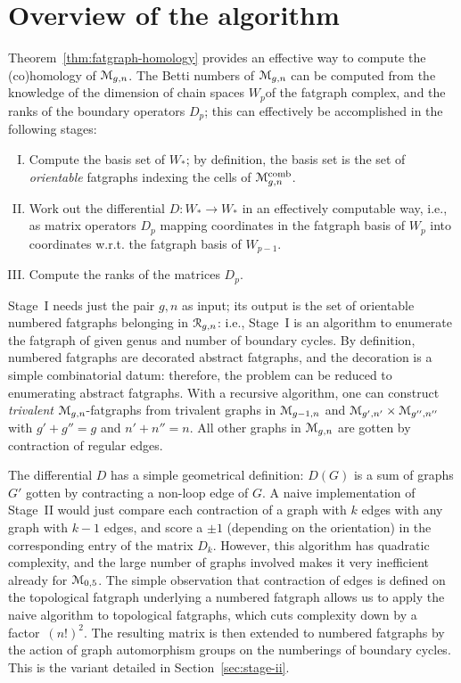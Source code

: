 \section[Overview]{Overview of the algorithm}
\label{sec:overview}

Theorem~\ref{thm:fatgraph-homology} provides an effective way to compute the
(co)homology of $\mathcal{M}_{g,n}$.  The Betti numbers of $\mathcal{M}_{g,n}$ can be
computed from the knowledge of the dimension of chain spaces $W_p$of
the fatgraph complex, and the ranks of the boundary operators $D_p$;
this can effectively be accomplished in the following stages:
\begin{enumerate}[I.]
\item Compute the basis set of $W_*$; by definition, the basis set is
  the set of \emph{orientable} fatgraphs indexing
  the cells of $\mathcal{M}\sp{\text{comb}}_{g,n}$.
\item Work out the differential $D: W_* \to W_*$ in an
  effectively computable way, i.e., as matrix operators $D_p$ mapping
  coordinates in the fatgraph basis of $W_p$ into coordinates
  w.r.t. the fatgraph basis of $W_{p-1}$.
\item Compute the ranks of the matrices $D_p$.
\end{enumerate}

Stage~I needs just the pair $g,n$ as input; its output is the set of
orientable numbered fatgraphs belonging in $\mathcal{R}_{g,n}$: i.e., Stage~I
is an algorithm to enumerate the fatgraph of given genus and number of
boundary cycles. By definition, numbered fatgraphs are decorated
abstract fatgraphs, and the decoration is a simple combinatorial
datum: therefore, the problem can be reduced to enumerating abstract
fatgraphs.  With a recursive algorithm, one can construct
\emph{trivalent} $\mathcal{M}_{g,n}$-fatgraphs from trivalent graphs in
$\mathcal{M}_{g-1,n}$ and $\mathcal{M}_{g',n'} \times \mathcal{M}_{g'',n''}$ with $g'+g''=g$ and
$n'+n''=n$.  All other graphs in $\mathcal{M}_{g,n}$ are gotten by contraction
of regular edges.

The differential $D$ has a simple geometrical definition: $D(G)$ is a
sum of graphs $G'$ gotten by contracting a non-loop edge of $G$. A
naive implementation of Stage~II would just compare each contraction
of a graph with $k$ edges with any graph with $k-1$ edges, and score a
$\pm 1$ (depending on the orientation) in the corresponding entry of
the matrix $D_k$.  However, this algorithm has quadratic complexity,
and the large number of graphs involved makes it very inefficient
already for $\mathcal{M}_{0,5}$.  The simple observation that contraction of
edges is defined on the topological fatgraph underlying a numbered
fatgraph allows us to apply the naive algorithm to topological
fatgraphs, which cuts complexity down by a factor~$(n!)^2$.  The
resulting matrix is then extended to numbered fatgraphs by the action
of graph automorphism groups on the numberings of boundary cycles.
This is the variant detailed in Section~\ref{sec:stage-ii}.

